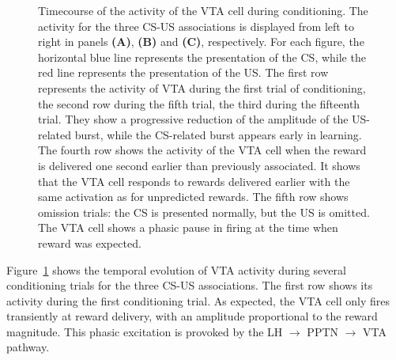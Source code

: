 \documentclass[
  11pt,
  a4paper,
]{scrbook}
\begin{document}
\begin{figure}


\caption{\label{fig-finr:vta_timecourse}Timecourse of the activity of
the VTA cell during conditioning. The activity for the three CS-US
associations is displayed from left to right in panels \textbf{(A)},
\textbf{(B)} and \textbf{(C)}, respectively. For each figure, the
horizontal blue line represents the presentation of the CS, while the
red line represents the presentation of the US. The first row represents
the activity of VTA during the first trial of conditioning, the second
row during the fifth trial, the third during the fifteenth trial. They
show a progressive reduction of the amplitude of the US-related burst,
while the CS-related burst appears early in learning. The fourth row
shows the activity of the VTA cell when the reward is delivered one
second earlier than previously associated. It shows that the VTA cell
responds to rewards delivered earlier with the same activation as for
unpredicted rewards. The fifth row shows omission trials: the CS is
presented normally, but the US is omitted. The VTA cell shows a phasic
pause in firing at the time when reward was expected.}

\end{figure}%

Figure~\ref{fig-finr:vta_timecourse} shows the temporal evolution of VTA
activity during several conditioning trials for the three CS-US
associations. The first row shows its activity during the first
conditioning trial. As expected, the VTA cell only fires transiently at
reward delivery, with an amplitude proportional to the reward magnitude.
This phasic excitation is provoked by the LH \(\rightarrow\) PPTN
\(\rightarrow\) VTA pathway.
\end{document}
